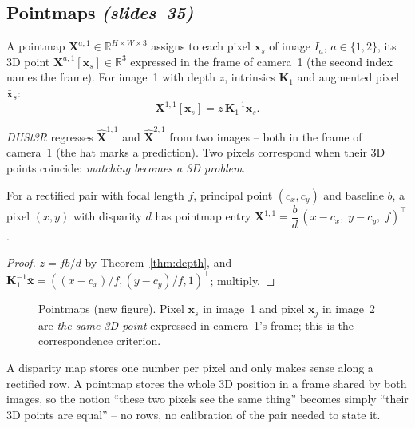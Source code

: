 \documentclass[11pt,a4paper]{article}
\newcommand{\slr}[1]{\texorpdfstring{\emph{(slides~#1)}}{(slides #1)}}
\newcommand{\vx}{\bm{x}}
\newcommand{\xb}{\bar{\bm{x}}}
\newcommand{\K}{\bm{K}}
\newcommand{\Xhat}{\hat{\bm{X}}}
\theoremstyle{definition}
\begin{document}
\subsection{Pointmaps \slr{35}}
\begin{Definition}[Pointmap]
A pointmap $\bm X^{a,1}\in\mathbb R^{H\times W\times3}$ assigns to each pixel $\vx_s$ of image $I_a$, $a\in\{1,2\}$, its 3D point $\bm X^{a,1}[\vx_s]\in\mathbb R^3$ expressed in the frame of camera~1 (the second index names the frame). For image~1 with depth $z$, intrinsics $\K_1$ and augmented pixel $\xb_s$:
\[ \bm X^{1,1}[\vx_s]=z\,\K_1^{-1}\xb_s. \]
\end{Definition}
\emph{DUSt3R} regresses $\Xhat^{1,1}$ and $\Xhat^{2,1}$ from two images -- both in the frame of camera~1 (the hat marks a prediction). Two pixels correspond when their 3D points coincide: \emph{matching becomes a 3D problem}.
\begin{Proposition}
For a rectified pair with focal length $f$, principal point $(c_x,c_y)$ and baseline $b$, a pixel $(x,y)$ with disparity $d$ has pointmap entry $\bm X^{1,1}=\dfrac{b}{d}\,(x-c_x,\;y-c_y,\;f)^{\top}$.
\end{Proposition}
\begin{proof}
$z=fb/d$ by Theorem~\ref{thm:depth}, and $\K_1^{-1}\xb=((x-c_x)/f,(y-c_y)/f,1)^{\top}$; multiply.
\end{proof}
\begin{figure}[H]\centering
{}
\caption{Pointmaps (new figure). Pixel $\vx_s$ in image~1 and pixel $\vx_j$ in image~2 are \emph{the same 3D point} expressed in camera~1's frame; this is the correspondence criterion.}
\end{figure}
\begin{intuition}
A disparity map stores one number per pixel and only makes sense along a rectified row. A pointmap stores the whole 3D position in a frame shared by both images, so the notion ``these two pixels see the same thing'' becomes simply ``their 3D points are equal'' -- no rows, no calibration of the pair needed to state it.
\end{intuition}
\end{document}
